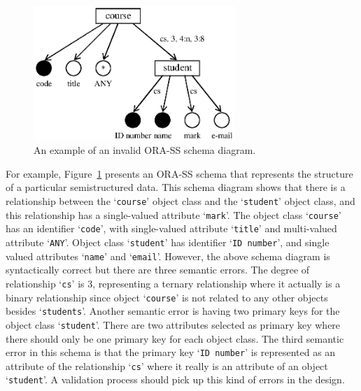 \documentclass{entcs}
\begin{document}
\begin{figure}[ht]
  \centering
  \includegraphics[width=76mm]{schema.eps}
  \caption{An example of an invalid ORA-SS schema diagram.}
  \label{schema}
\end{figure}
For example, Figure~\ref{schema} presents an ORA-SS schema that
represents the structure of a particular semistructured data.
This schema diagram shows that there is a relationship between the
`\texttt{course}' object class and the `\texttt{student}' object
class, and this relationship has a single-valued attribute
`\texttt{mark}'. The object class `\texttt{course}' has an
identifier `\texttt{code}', with single-valued attribute
`\texttt{title}' and multi-valued attribute `\texttt{ANY}'. Object
class `\texttt{student}' has identifier `\texttt{ID number}', and
single valued attributes `\texttt{name}' and `\texttt{email}'.
However, the above schema diagram is syntactically correct but
there are three semantic errors. The degree of relationship
`\texttt{cs}' is 3, representing a ternary relationship where it
actually is a binary relationship since object `\texttt{course}'
is not related to any other objects besides `\texttt{students}'.
Another semantic error is having two primary keys for the object
class `\texttt{student}'. There are two attributes selected as
primary key where there should only be one primary key for each
object class. The third semantic error in this schema is that the
primary key `\texttt{ID number}' is represented as an attribute of
the relationship `\texttt{cs}' where it really is an attribute of
an object `\texttt{student}'. A validation process should pick up
this kind of errors in the design.
\end{document}
